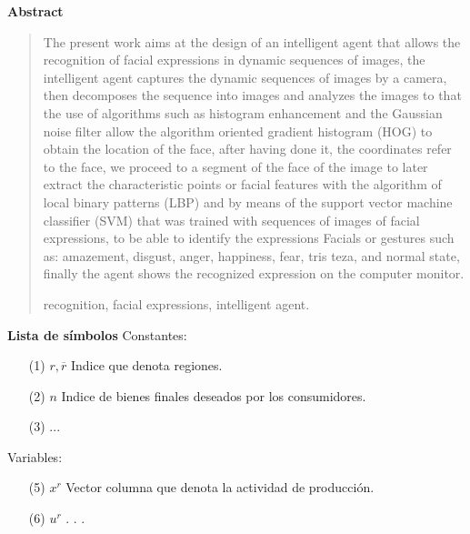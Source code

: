 \newpage
\begin{center}
 {\bf\LARGE Abstract}\vskip 1.5cm
\end{center} 
\begin{quotation}

The present work aims at the design of an intelligent agent that allows the recognition of facial expressions in dynamic sequences of images, the intelligent agent captures the dynamic sequences of images by a camera, then decomposes the sequence into images and analyzes the images to that the use of algorithms such as histogram enhancement and the Gaussian noise filter allow the algorithm oriented gradient histogram (HOG) to obtain the location of the face, after having done it, the coordinates refer to the face, we proceed to a segment of the face of the image to later extract the characteristic points or facial features with the algorithm of local binary patterns (LBP) and by means of the support vector machine classifier (SVM) that was trained with sequences of images of facial expressions, to be able to identify the expressions Facials or gestures such as: amazement, disgust, anger, happiness, fear, tris teza, and normal state, finally the agent shows the recognized expression on the computer monitor.


\vskip 0.3cm
\hspace*{-0.6cm}{\bf Keywords:} recognition, facial expressions, intelligent agent.
\end{quotation}


\newpage
{}
 {\bf\LARGE Lista de símbolos}
 \vskip 1.5cm
Constantes: 
\begin{enumerate}
\item[(1)]$r,\overline{r} $ \hspace*{0.8cm} Indice que denota regiones.
\item[(2)] $n $ \hspace*{1.1cm} Indice de bienes finales deseados por los consumidores.
\item[(3)] ...
\vskip 3cm
\end{enumerate} 
\vskip 0.3cm
Variables:
\begin{enumerate}
\item[(5)] $ x^{r} $ \hspace*{1cm} Vector columna que denota la actividad de producción.
\item[(6)] $ u^{r} $ \hspace*{1.2cm} . . .
\end{enumerate}
